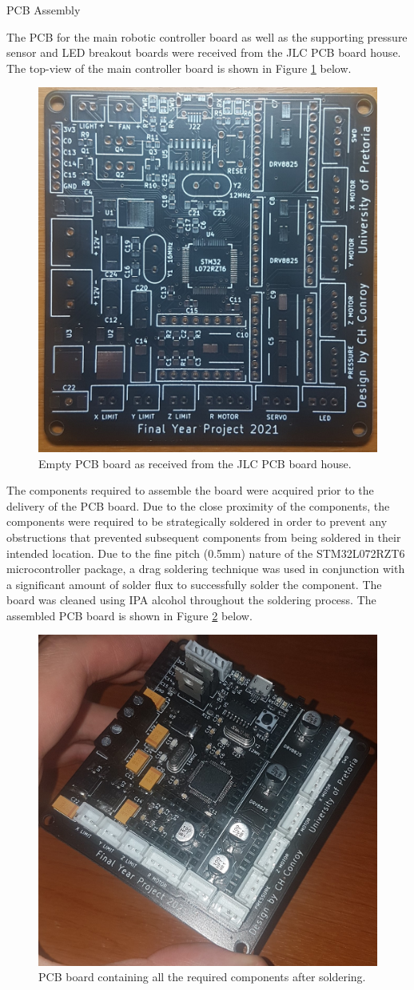 PCB Assembly

The PCB for the main robotic controller board as well as the supporting pressure sensor and LED breakout boards were received from the JLC PCB board house. The top-view of the main controller board is shown in Figure \ref{fig:empty-pcb} below.

\begin{figure}[H]
	\centering
	\includegraphics[width=0.6\linewidth]{figures/pcb-board.jpg}
	\caption{Empty PCB board as received from the JLC PCB board house.}
	\label{fig:empty-pcb}
\end{figure}

The components required to assemble the board were acquired prior to the delivery of the PCB board. Due to the close proximity of the components, the components were required to be strategically soldered in order to prevent any obstructions that prevented subsequent components from being soldered in their intended location. Due to the fine pitch (0.5mm) nature of the STM32L072RZT6 microcontroller package, a drag soldering technique was used in conjunction with a significant amount of solder flux to successfully solder the component. The board was cleaned using IPA alcohol throughout the soldering process. The assembled PCB board is shown in Figure \ref{fig:assembled-pcb} below.

\begin{figure}[H]
	\centering
	\includegraphics[width=0.6\linewidth]{figures/final-pcb.jpg}
	\caption{PCB board containing all the required components after soldering.}
	\label{fig:assembled-pcb}
\end{figure}

